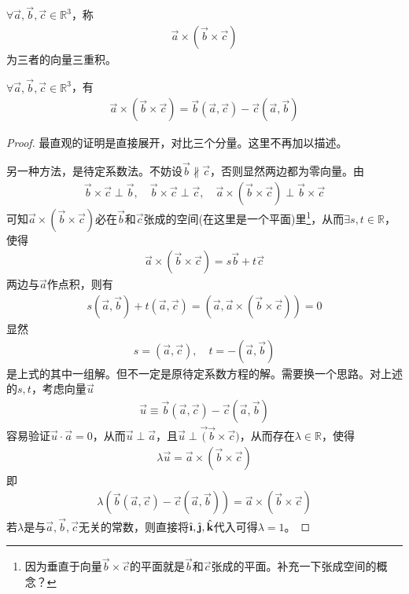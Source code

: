 \begin{definition}
  $\forall \vec a,\vec b,\vec c\in\mathbb{R}^3$，称
  \begin{align*}
    \vec a\times(\vec b\times \vec c)
  \end{align*}
  为三者的向量三重积。
\end{definition}

\begin{lemma}
  $\forall \vec a,\vec b,\vec c\in\mathbb{R}^3$，有
  \begin{align*}
    \vec a\times(\vec b\times \vec c)=\vec b(\vec a,\vec c) - \vec c(\vec a,\vec b)
  \end{align*}
\end{lemma}
\begin{proof}
  最直观的证明是直接展开，对比三个分量。这里不再加以描述。

  另一种方法，是待定系数法。不妨设$\vec b\not\parallel\vec c$，否则显然两边都为零向量。由
  \begin{align*}
    \vec b\times\vec c\perp \vec b,\quad \vec b\times\vec c\perp \vec c,\quad
    \vec a\times(\vec b\times\vec c)\perp \vec b\times \vec c
  \end{align*}
  可知$\vec a\times(\vec b\times\vec c)$必在$\vec b$和$\vec c$张成的空间(在这里是一个平面)里\footnote{因为垂直于向量$\vec b\times\vec c$的平面就是$\vec b$和$\vec c$张成的平面。\color{red}补充一下张成空间的概念？}，从而$\exists s,t\in\mathbb{R}$，使得
  \begin{align*}
    \vec a\times(\vec b\times\vec c) = s\vec b +t\vec c
  \end{align*}
  两边与$\vec a$作点积，则有
  \begin{align*}
    s(\vec a,\vec b)+t(\vec a,\vec c)=(\vec a, \vec a\times(\vec b\times\vec c))=0
  \end{align*}
  显然
  \begin{align*}
    s=(\vec a,\vec c),\quad
    t=-(\vec a,\vec b)
  \end{align*}
  是上式的其中一组解。{\color{red}但不一定是原待定系数方程的解。需要换一个思路。}对上述的$s,t$，考虑向量$\vec u$
  \begin{align*}
    \vec u\equiv \vec b(\vec a,\vec c) - \vec c(\vec a, \vec b)
  \end{align*}
  容易验证$\vec u\cdot \vec a=0$，从而$\vec u\perp\vec a$，且$\vec u\perp\vec (\vec b\times\vec c)$，从而存在$\lambda\in\mathbb{R}$，使得
  \begin{align*}
    \lambda \vec u = \vec a\times(\vec b\times\vec c)
  \end{align*}
  即
  \begin{align*}
    \lambda(\vec b(\vec a,\vec c) - \vec c(\vec a, \vec b)) = \vec a\times(\vec b\times\vec c)
  \end{align*}
  {\color{red}若$\lambda$是与$\vec a,\vec b,\vec c$无关的常数，则直接将$\ihat, \jhat, \khat$代入可得$\lambda=1$。}



\end{proof}
